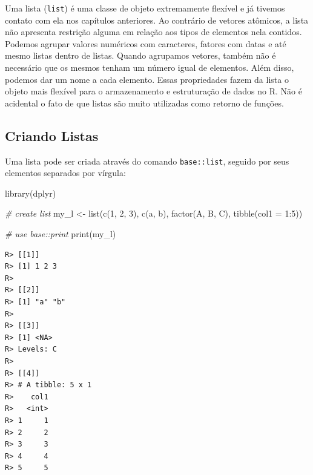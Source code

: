 \documentclass[
  11pt,
]{book}
\newenvironment{Shaded}{\begin{snugshade}}{\end{snugshade}}
\newcommand{\AttributeTok}[1]{\textcolor[rgb]{0.61,0.61,0.61}{#1}}
\newcommand{\CommentTok}[1]{\textcolor[rgb]{0.37,0.37,0.37}{\textit{#1}}}
\newcommand{\DecValTok}[1]{\textcolor[rgb]{0.06,0.06,0.06}{#1}}
\newcommand{\FunctionTok}[1]{\textcolor[rgb]{0,0,0}{#1}}
\newcommand{\NormalTok}[1]{#1}
\newcommand{\OtherTok}[1]{\textcolor[rgb]{0.37,0.37,0.37}{#1}}
\newcommand{\SpecialCharTok}[1]{\textcolor[rgb]{0,0,0}{#1}}
\newcommand{\StringTok}[1]{\textcolor[rgb]{0.5,0.5,0.5}{#1}}
\begin{document}
Uma lista (\texttt{list}) é uma classe de objeto extremamente flexível e já tivemos contato com ela nos capítulos anteriores. Ao contrário de vetores atômicos, a lista não apresenta restrição alguma em relação aos tipos de elementos nela contidos. Podemos agrupar valores numéricos com caracteres, fatores com datas e até mesmo listas dentro de listas. Quando agrupamos vetores, também não é necessário que os mesmos tenham um número igual de elementos. Além disso, podemos dar um nome a cada elemento. Essas propriedades fazem da lista o objeto mais flexível para o armazenamento e estruturação de dados no R. Não é acidental o fato de que listas são muito utilizadas como retorno de funções.

\hypertarget{criando-listas}{%
\subsection{Criando Listas}\label{criando-listas}}

Uma lista pode ser criada através do comando \texttt{base::list}, seguido por seus elementos separados por vírgula: 

\begin{Shaded}
\begin{Highlighting}[]
\FunctionTok{library}\NormalTok{(dplyr)}

\CommentTok{\# create list}
\NormalTok{my\_l }\OtherTok{\textless{}{-}} \FunctionTok{list}\NormalTok{(}\FunctionTok{c}\NormalTok{(}\DecValTok{1}\NormalTok{, }\DecValTok{2}\NormalTok{, }\DecValTok{3}\NormalTok{),}
             \FunctionTok{c}\NormalTok{(}\StringTok{\textquotesingle{}a\textquotesingle{}}\NormalTok{, }\StringTok{\textquotesingle{}b\textquotesingle{}}\NormalTok{),}
             \FunctionTok{factor}\NormalTok{(}\StringTok{\textquotesingle{}A\textquotesingle{}}\NormalTok{, }\StringTok{\textquotesingle{}B\textquotesingle{}}\NormalTok{, }\StringTok{\textquotesingle{}C\textquotesingle{}}\NormalTok{),}
             \FunctionTok{tibble}\NormalTok{(}\AttributeTok{col1 =} \DecValTok{1}\SpecialCharTok{:}\DecValTok{5}\NormalTok{))}

\CommentTok{\# use base::print}
\FunctionTok{print}\NormalTok{(my\_l)}
\end{Highlighting}
\end{Shaded}

\begin{verbatim}
R> [[1]]
R> [1] 1 2 3
R> 
R> [[2]]
R> [1] "a" "b"
R> 
R> [[3]]
R> [1] <NA>
R> Levels: C
R> 
R> [[4]]
R> # A tibble: 5 x 1
R>    col1
R>   <int>
R> 1     1
R> 2     2
R> 3     3
R> 4     4
R> 5     5
\end{verbatim}
\end{document}
